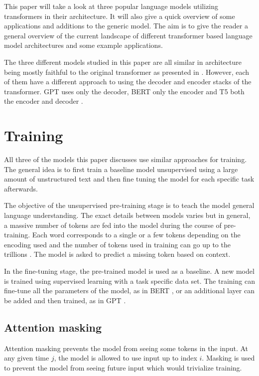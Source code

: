 \documentclass[twoside]{article}
\begin{document}
This paper will take a look at three popular language models utilizing
transformers in their architecture. It will also give a quick overview
of some applications and additions to the generic model. The aim is to
give the reader a general overview of the current landscape of different
transformer based language model architectures and some example applications.

The three different models studied in this paper are all similar in architecture 
being mostly faithful to the original transformer as presented in 
\cite{vaswani_attention_2017}. However, each of them have a different approach
to using the decoder and encoder stacks of the transformer. GPT uses only
the decoder, BERT only the encoder and T5 both the encoder and decoder
\cite{radford_improving_nodate,devlin_bert_2019,raffel_exploring_2020}.

\section{Training}
All three of the models this paper discusses use similar approaches for 
training. The general idea is to first train a baseline model unsupervised 
using a large amount of unstructured text and then fine tuning the model
for each specific task afterwards. 

The objective of the unsupervised pre-training stage is to teach the model
general language understanding. The exact details between models varies but
in general, a massive number of tokens are fed into the model during the course
of pre-training. Each word corresponds to a single or a few tokens depending on 
the encoding used \cite{noauthor_pricing_nodate} and the number of tokens
used in training can go up to the trillions \cite{raffel_exploring_2020}. 
The model is asked to predict a missing token based on context. 

In the fine-tuning stage, the pre-trained model is used as a baseline. A new
model is trained using supervised learning with a task specific data set. 
The training can fine-tune all the parameters of the model, as in BERT 
\cite{devlin_bert_2019}, or an additional layer can be added and then
trained, as in GPT \cite{radford_improving_nodate}.

\subsection{Attention masking}
Attention masking prevents the model from seeing some tokens in the input. At any
given time $j$, the model is allowed to use input up to index $i$. Masking is used to prevent the model from
seeing future input which would trivialize training. \cite{raffel_exploring_2020}
\end{document}
